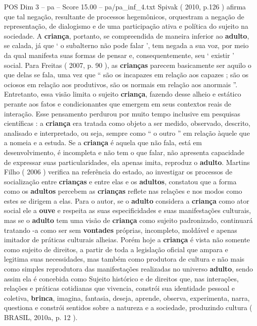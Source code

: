 \begin{textsample}{POS Dim 3 – pa – Score 15.00 – pa/pa\_inf\_4.txt}
Spivak ( 2010, p.126 ) afirma que tal negação, resultante de processos hegemônicos, orquestram a negação de representação, de dialogismo e de uma participação ativa e política do sujeito na sociedade.
A \textbf{criança}, portanto, se compreendida de maneira inferior ao \textbf{adulto}, se calada, já que ‘ o subalterno não pode falar ’, tem negada a sua voz, por meio da qual manifesta suas formas de pensar e, consequentemente, seu ‘ existir ’ social.
Para Freitas ( 2007, p. 90 ), as \textbf{crianças} parecem basicamente ser aquilo o que delas se fala, uma vez que “ são os incapazes em relação aos capazes ; são os ociosos em relação aos produtivos, são os normais em relação aos anormais ”.
Entretanto, essa visão limita o sujeito \textbf{criança}, fazendo desse alheio e estático perante aos fatos e condicionantes que emergem em seus contextos reais de interação.
Esse pensamento perdurou por muito tempo inclusive em pesquisas científicas : a \textbf{criança} era tratada como objeto a ser medido, observado, descrito, analisado e interpretado, ou seja, sempre como “ o outro ” em relação àquele que a nomeia e a estuda.
Se a \textbf{criança} é aquela que não fala, está em desenvolvimento, é incompleta e não tem o que falar, não apresenta capacidade de expressar suas particularidades, ela apenas imita, reproduz o \textbf{adulto}.
Martins Filho ( 2006 ) verifica na referência do estado, ao investigar os processos de socialização entre \textbf{crianças} e entre elas e os \textbf{adultos}, constatou que a forma como os \textbf{adultos} percebem as \textbf{crianças} reflete nas relações e nos modos como estes se dirigem a elas.
Para o autor, se o \textbf{adulto} considera a \textbf{criança} como ator social ele a \textbf{ouve} e respeita as suas especificidades e suas manifestações culturais, mas se o \textbf{adulto} tem uma visão de \textbf{criança} como sujeito padronizado, continuará tratando -a como ser sem \textbf{vontades} próprias, incompleto, moldável e apenas imitador de práticas culturais alheias.
Porém hoje a \textbf{criança} é vista não somente como sujeito de direitos, a partir de toda a legislação oficial que ampara e legitima suas necessidades, mas também como produtora de cultura e não mais como simples reprodutora das manifestações realizadas no universo \textbf{adulto}, sendo assim ela é concebida como Sujeito histórico e de direitos que, nas interações, relações e práticas cotidianas que vivencia, constrói sua identidade pessoal e coletiva, \textbf{brinca}, imagina, fantasia, deseja, aprende, observa, experimenta, narra, questiona e constrói sentidos sobre a natureza e a sociedade, produzindo cultura ( BRASIL, 2010a, p. 12 ).

\end{textsample}
